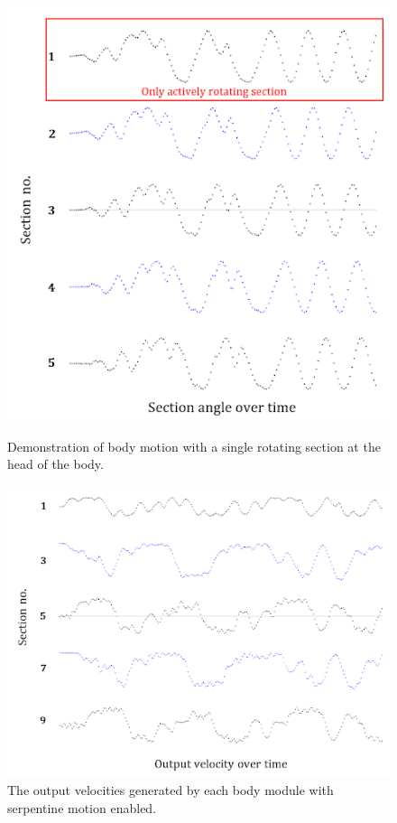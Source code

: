 \documentclass{article}
\begin{document}
\begin{figure}[h]
\begin{minipage}[b]{.4\textwidth}
\centering
\includegraphics[width=1\textwidth]{cpgMirroring}
\caption{Demonstration of body motion with a single rotating section at the head of the body.}
\end{minipage}
\hfill
\begin{minipage}[b]{.5\textwidth}
\centering
\includegraphics[width=1.2\textwidth]{cpgSerpentine}
\caption{The output velocities generated by each body module with serpentine motion enabled.}
\end{minipage}
\end{figure}
\end{document}

